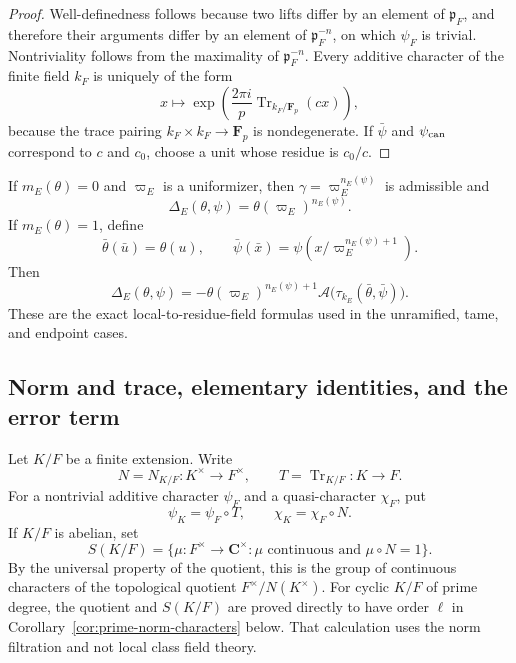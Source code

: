 \documentclass[11pt]{amsart}
\theoremstyle{definition}
\theoremstyle{remark}
\newcommand{\C}{\mathbf C}
\newcommand{\F}{\mathbf F}
\newcommand{\p}{\mathfrak p}
\newcommand{\Tr}{\operatorname{Tr}}
\newcommand{\Aphase}{\mathcal A}
\begin{document}
\begin{proof}
Well-definedness follows because two lifts differ by an element of
$\p_F$, and therefore their arguments differ by an element of
$\p_F^{-n}$, on which $\psi_F$ is trivial.  Nontriviality follows
from the maximality of $\p_F^{-n}$.  Every additive character of the
finite field $k_F$ is uniquely of the form
\[
 x\longmapsto
 \exp\left(\frac{2\pi i}{p}
   \Tr_{k_F/\F_p}(cx)\right),
\]
because the trace pairing $k_F\times k_F\to\F_p$ is nondegenerate.
If $\bar\psi$ and $\psi_{\rm can}$ correspond to $c$ and $c_0$,
choose a unit whose residue is $c_0/c$.
\end{proof}

If $m_E(\theta)=0$ and $\varpi_E$ is a uniformizer, then
$\gamma=\varpi_E^{n_E(\psi)}$ is admissible and
\begin{equation}\label{eq:unramified-character-local-constant}
 \Delta_E(\theta,\psi)
 =\theta(\varpi_E)^{n_E(\psi)}.
\end{equation}
If $m_E(\theta)=1$, define
\[
 \bar\theta(\bar u)=\theta(u),
 \qquad
 \bar\psi(\bar x)
 =\psi(x/\varpi_E^{n_E(\psi)+1}).
\]
Then
\begin{equation}\label{eq:conductor-one-local-gauss}
 \Delta_E(\theta,\psi)
 =-\theta(\varpi_E)^{n_E(\psi)+1}
   \Aphase\bigl(\tau_{k_E}(\bar\theta,\bar\psi)\bigr).
\end{equation}
These are the exact local-to-residue-field formulas used in the
unramified, tame, and endpoint cases.

\subsection{Norm and trace, elementary identities, and the error term}

Let $K/F$ be a finite extension.  Write
\[
 N=N_{K/F}:K^\times\to F^\times,
 \qquad
 T=\Tr_{K/F}:K\to F.
\]
For a nontrivial additive character $\psi_F$ and a quasi-character
$\chi_F$, put
\[
 \psi_K=\psi_F\circ T,
 \qquad
 \chi_K=\chi_F\circ N.
\]
If $K/F$ is abelian, set
\begin{equation}\label{eq:def-S}
 S(K/F)=\{\mu:F^\times\to\C^\times:
   \mu\text{ continuous and }\mu\circ N=1\}.
\end{equation}
By the universal property of the quotient, this is the group of
continuous characters of the topological quotient
$F^\times/N(K^\times)$.  For cyclic $K/F$ of prime degree, the
quotient and $S(K/F)$ are proved directly to have order $\ell$ in
Corollary~\ref{cor:prime-norm-characters} below.  That calculation uses
the norm filtration and not local class field theory.
\end{document}
